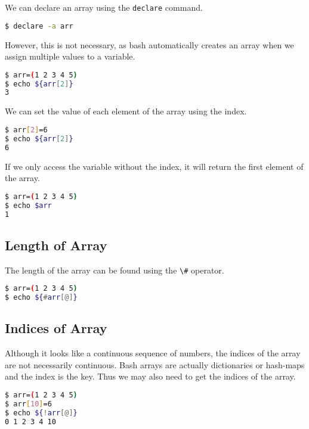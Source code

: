 We can declare an array using the \lstinline{declare} command.

\begin{lstlisting}[language=bash]
$ declare -a arr
\end{lstlisting}

However, this is not necessary, as bash automatically creates an array when we assign multiple values to a variable.

\begin{lstlisting}[language=bash]
$ arr=(1 2 3 4 5)
$ echo ${arr[2]}
3
\end{lstlisting}

We can set the value of each element of the array using the index.

\begin{lstlisting}[language=bash]
$ arr[2]=6
$ echo ${arr[2]}
6
\end{lstlisting}

If we only access the variable without the index, it will return the first element of the array.

\begin{lstlisting}[language=bash]
$ arr=(1 2 3 4 5)
$ echo $arr
1
\end{lstlisting}

\subsection{Length of Array}

The length of the array can be found using the \lstinline{\#} operator.

\begin{lstlisting}[language=bash]
$ arr=(1 2 3 4 5)
$ echo ${#arr[@]}
\end{lstlisting}

\subsection{Indices of Array}

Although it looks like a continuous sequence of numbers, the indices of the array are not necessarily continuous. Bash arrays are actually dictionaries or hash-maps
and the index is the key.
Thus we may also need to get the indices of the array.

\begin{lstlisting}[language=bash]
$ arr=(1 2 3 4 5)
$ arr[10]=6
$ echo ${!arr[@]}
0 1 2 3 4 10
\end{lstlisting}

